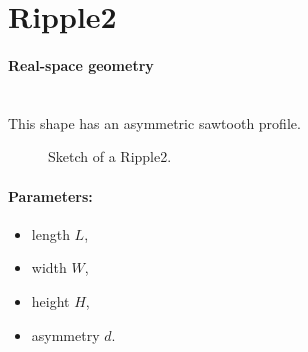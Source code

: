 \newpage
\section{Ripple2}   

\paragraph{Real-space geometry}\mbox{}\\
This shape has an asymmetric sawtooth profile.

\begin{figure}[ht]
\hfill
{}
\hfill
{}
\hfill
\caption{Sketch of a Ripple2.}
\label{fig:ripple2}
\end{figure}

\FloatBarrier

\paragraph{Parameters:}
\begin{itemize}
\item length $L$, 
\item width $W$, 
\item height $H$,
\item asymmetry $d$. 
\end{itemize}

